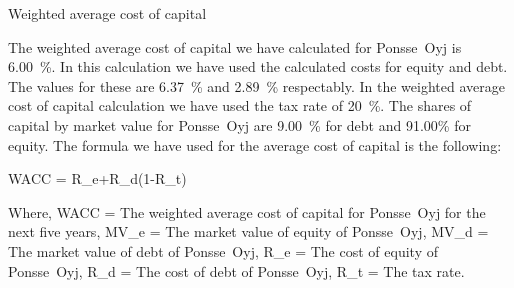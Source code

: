 Weighted average cost of capital

The weighted average cost of capital we have calculated for Ponsse~Oyj is 6.00~\%. In this calculation we have used the calculated costs for equity and debt. The values for these are 6.37~\% and 2.89~\% respectably. In the weighted average cost of capital calculation we have used the tax rate of 20~\%. The shares of capital by market value for Ponsse~Oyj are 9.00~\% for debt and 91.00\% for equity. The formula we have used for the average cost of capital is the following:

\textup{WACC} = \cdot R_{e}+\cdot R_{d}\cdot (1-R_{t})

Where,
WACC = The weighted average cost of capital for Ponsse~Oyj for the next five years,
MV_{e} = The market value of equity of Ponsse~Oyj,
MV_{d} = The market value of debt of Ponsse~Oyj,
R_{e} = The cost of equity of Ponsse~Oyj,
R_{d} = The cost of debt of Ponsse~Oyj,
R_{t} = The tax rate.
